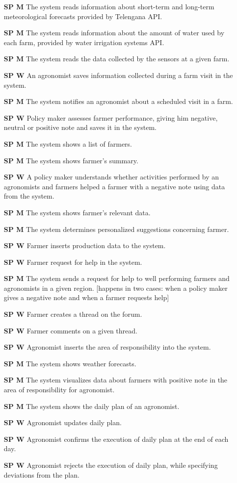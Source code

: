 \begin{itemize}
    \item [\textbf{SP M}] The system reads information about short-term and long-term meteorological forecasts provided by Telengana API.
    \item [\textbf{SP M}] The system reads information about the amount of water used by each farm, provided by water irrigation systems API.
    \item [\textbf{SP M}] The system reads the data collected by the sensors at a given farm.
    \item [\textbf{SP W}] An agronomist saves information collected during a farm visit in the system.
    \item [\textbf{SP M}] The system notifies an agronomist about a scheduled visit in a farm.
    \item [\textbf{SP W}] Policy maker assesses farmer performance, giving him negative, neutral or positive note and saves it in the system.
    \item [\textbf{SP M}] The system shows a list of farmers.
    \item [\textbf{SP M}] The system shows farmer's summary.
    \item [\textbf{SP W}] A policy maker understands whether activities performed by an agronomists and farmers helped a farmer with a negative note using data from the system.
    \item [\textbf{SP M}] The system shows farmer's relevant data.
    \item [\textbf{SP M}] The system determines personalized suggestions concerning farmer.
    \item [\textbf{SP W}] Farmer inserts production data to the system.
    \item [\textbf{SP W}] Farmer request for help in the system.
    \item [\textbf{SP M}] The system sends a request for help to well performing farmers and agronomists in a given region. [happens in two cases: when a policy maker gives a negative note and when a farmer requests help]
    \item [\textbf{SP W}] Farmer creates a thread on the forum. 
    \item [\textbf{SP W}] Farmer comments on a given thread.
    \item [\textbf{SP W}] Agronomist inserts the area of responsibility into the system.
    \item [\textbf{SP M}] The system shows weather forecasts.
    \item [\textbf{SP M}] The system visualizes data about farmers with positive note in the area of responsibility for agronomist.
    \item [\textbf{SP M}] The system shows the daily plan of an agronomist.
    \item [\textbf{SP W}] Agronomist updates daily plan.
    \item [\textbf{SP W}] Agronomist confirms the execution of daily plan at the end of each day.
    \item [\textbf{SP W}] Agronomist rejects the execution of daily plan, while specifying deviations from the plan.
\end{itemize}

